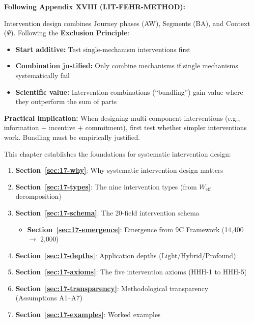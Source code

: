 \begin{tcolorbox}[colback=red!5!white, colframe=red!75!black,
    title=\textbf{Methodological Note: The Exclusion Principle (Appendix XVIII)}]
\textbf{Following Appendix XVIII (LIT-FEHR-METHOD):}

Intervention design combines Journey phases (AW), Segments (BA), and Context ($\Psi$). Following the \textbf{Exclusion Principle}:
\begin{itemize}[nosep]
    \item \textbf{Start additive:} Test single-mechanism interventions first
    \item \textbf{Combination justified:} Only combine mechanisms if single mechanisms systematically fail
    \item \textbf{Scientific value:} Intervention combinations (``bundling'') gain value where they outperform the sum of parts
\end{itemize}

\textbf{Practical implication:} When designing multi-component interventions (e.g., information + incentive + commitment), first test whether simpler interventions work. Bundling must be empirically justified.
\end{tcolorbox}


\begin{tcolorbox}[colback=green!5!white, colframe=green!75!black,
    title=Chapter Overview]

This chapter establishes the foundations for systematic intervention design:

\begin{enumerate}
\item \textbf{Section~\ref{sec:17-why}}: Why systematic intervention design matters
\item \textbf{Section~\ref{sec:17-types}}: The nine intervention types (from $W_{\text{eff}}$ decomposition)
\item \textbf{Section~\ref{sec:17-schema}}: The 20-field intervention schema
    \begin{itemize}[nosep]
    \item \textbf{Section~\ref{sec:17-emergence}}: Emergence from 9C Framework (14,400 $\rightarrow$ 2,000)
    \end{itemize}
\item \textbf{Section~\ref{sec:17-depths}}: Application depths (Light/Hybrid/Profound)
\item \textbf{Section~\ref{sec:17-axioms}}: The five intervention axioms (HHH-1 to HHH-5)
\item \textbf{Section~\ref{sec:17-transparency}}: Methodological transparency (Assumptions A1--A7)
\item \textbf{Section~\ref{sec:17-examples}}: Worked examples
\end{enumerate}
\end{tcolorbox}


